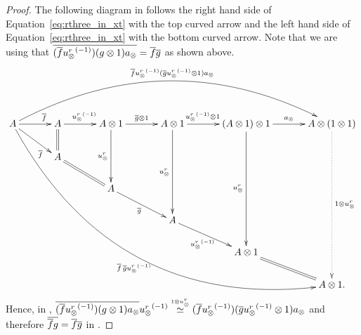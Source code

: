 \begin{proof}
      The following diagram in \X follows the right hand side of Equation~\ref{eq:rthree_in_xt}
      with the top curved arrow and the left hand side of Equation~\ref{eq:rthree_in_xt} with the
      bottom curved arrow. Note that we are using that
      $\overline{(\overline{f} {u_{\otimes}^r}^{(-1)}) (g\otimes 1) a_{\otimes}} = \overline{f}\overline{g}$ as shown above.
      \[
        \xymatrix @C=33pt @R=20pt{
          A \ar@/^45pt/[rrrrr]^{\restr{f} \inv{\usr}(\restr{g} \inv{\usr} \* 1)a_{\*}}
            \ar@/_65pt/[dddddrrrrr]_{\restr{f}\, \restr{g}\inv{\usr}}
            \ar[r]^(.7){\restr{f}}
            \ar[dr]_(.7){\restr{f}}
            &A \ar[r]^{\inv{\usr}}
            \ar@{=}[d]
            &A \* 1 \ar[r]^{\restr{g}\*1}
            \ar[dd]_{\usr}
            &A \* 1 \ar[r]^(.41){\inv{\usr}\* 1}
            \ar[ddd]_{\usr}
            &(A \* 1) \* 1 \ar[r]^{a_{\*}}
            \ar[dddd]_{\usr}
            & A \* (1\*1) \ar@{.>}[ddddd]^{1\*\usr}\\
          &A\ar@{=}[dr]\\
          &&A \ar[dr]_{\restr{g}}\\
          &&&A \ar[dr]_{\inv\usr}\\
          &&&&A\*1 \ar@{=}[dr]\\
          &&&&&A\*1.
        }
      \]
      Hence, in \X, $\overline{(\overline{f} {u_{\otimes}^r}^{(-1)}) (g\otimes 1) a_{\otimes}} {u_{\otimes}^r}^{(-1)} \overset{\scriptscriptstyle 1\otimes u_{\otimes}^r}{\simeq}
      (\overline{f} {u_{\otimes}^r}^{(-1)}) (\overline{g} {u_{\otimes}^r}^{(-1)}\otimes 1) a_{\otimes}$ and therefore $\overline{\overline{f} g} =
      \overline{f} \overline{g}$ in \Xt.


\end{proof}
